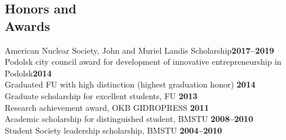 \documentclass[margin,line]{resume}
\begin{document}
\begin{resume}
    \section{\mysidestyle Honors and\\Awards}
        American Nuclear Society, John and Muriel Landis Scholarship\hfill \textbf{2017--2019}\vspace{.5mm}\\%
		Podolsk city council award for development of innovative entrepreneurship in Podolsk\hfill \textbf{2014}\vspace{.5mm}\\%
		Graduated FU with high distinction (highest graduation honor)                \hfill \textbf{2014}\vspace{.5mm}\\%
		Graduate scholarship for excellent students, FU                              \hfill \textbf{2013}\vspace{.5mm}\\%
		Research achievement award, OKB GIDROPRESS                                   \hfill\textbf{2011}\vspace{.5mm}\\%
		Academic scholarship for distinguished student, BMSTU		                 \hfill\textbf{2008--2010}\vspace{.5mm}\\%
		Student Society leadership scholarship, BMSTU                                \hfill\textbf{2004--2010}%
 

\end{resume}
\end{document}
